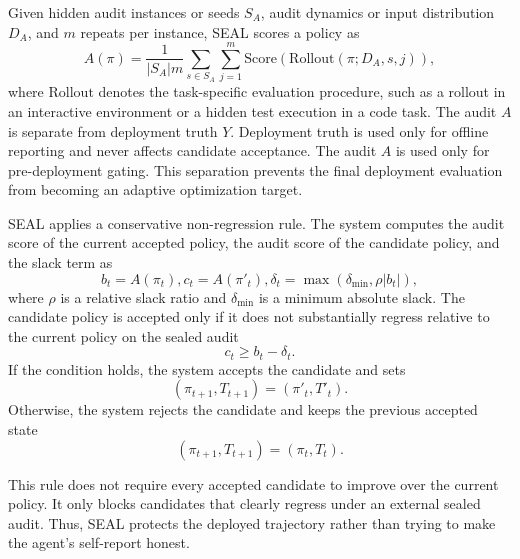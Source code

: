 \documentclass[letterpaper]{article} \usepackage{aaai2027}  \usepackage[hyphens]{url}  \usepackage{graphicx} \urlstyle{rm} \def\UrlFont{\rm}  \usepackage{natbib}  \usepackage{caption} \usepackage{amsfonts} \usepackage{multirow} \frenchspacing  \usepackage{algorithm}
\newcommand{\method}{SEAL}
\begin{document}
Given hidden audit instances or seeds $S_A$, audit dynamics or input distribution $D_A$, and $m$ repeats per instance, \method{} scores a policy as
\begin{equation}
\label{eq:audit}
A(\pi)=\frac{1}{|S_A|m}
\sum_{s\in S_A}\sum_{j=1}^{m}
\mathrm{Score}\!\left(\mathrm{Rollout}(\pi;D_A,s,j)\right),
\end{equation}
where $\mathrm{Rollout}$ denotes the task-specific evaluation procedure, such as a rollout in an interactive environment or a hidden test execution in a code task. The audit $A$ is separate from deployment truth $Y$. Deployment truth is used only for offline reporting and never affects candidate acceptance. The audit $A$ is used only for pre-deployment gating. This separation prevents the final deployment evaluation from becoming an adaptive optimization target.



\method{} applies a conservative non-regression rule. The system computes the audit score of the current accepted policy, the audit score of the candidate policy, and the slack term as
\begin{equation}
\label{eq:audit_scores}
b_t = A(\pi_t), 
c_t = A(\pi'_t), 
\delta_t = \max(\delta_{\min}, \rho |b_t|),
\end{equation}
where $\rho$ is a relative slack ratio and $\delta_{\min}$ is a minimum absolute slack.
The candidate policy is accepted only if it does not substantially regress relative to the current policy on the sealed audit
\begin{equation}
\label{eq:accept_rule}
c_t \geq b_t - \delta_t.
\end{equation}
If the condition holds, the system accepts the candidate and sets
\begin{equation}
\label{eq:accept_update}
(\pi_{t+1}, T_{t+1}) = (\pi'_t, T'_t).
\end{equation}
Otherwise, the system rejects the candidate and keeps the previous accepted state
\begin{equation}
\label{eq:reject_update}
(\pi_{t+1}, T_{t+1}) = (\pi_t, T_t).
\end{equation}

This rule does not require every accepted candidate to improve over the current policy. It only blocks candidates that clearly regress under an external sealed audit. Thus, \method{} protects the deployed trajectory rather than trying to make the agent's self-report honest.
\end{document}
